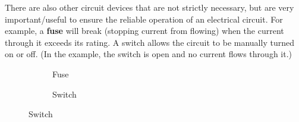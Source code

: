 There are also other circuit devices that are not strictly necessary, but are
very important/useful to ensure the reliable operation of an electrical
circuit. For example, a \textbf{fuse} will break (stopping current from
flowing) when the current through it exceeds its rating. A switch allows the
circuit to be manually turned on or off. (In the example, the switch is open
and no current flows through it.)
\begin{figure}[ht]
  \centering
  \begin{subfigure}{.35\textwidth}
    \centering
    \caption{Fuse}
  \end{subfigure}
  \begin{subfigure}{.35\textwidth}
    \centering
    \caption{Switch}
  \end{subfigure}
\end{figure}



%
%
%
  


